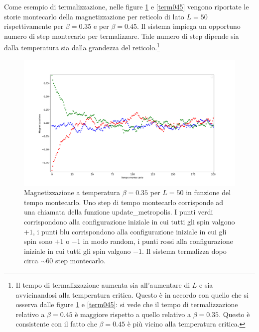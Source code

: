 \documentclass[10pt,a4paper]{article}
\begin{document}
Come esempio di termalizzazione, nelle figure \ref{term035} e \ref{term045} vengono riportate le storie montecarlo della magnetizzazione per reticolo di lato $L=50$ rispettivamente per $\beta=0.35$ e per $\beta=0.45$. Il sistema impiega un opportuno numero di step montecarlo per termalizzare. Tale numero di step dipende sia dalla temperatura sia dalla grandezza del reticolo.\footnote{Il tempo di termalizzazione aumenta sia all'aumentare di $L$ e sia avvicinandosi alla temperatura critica. Questo è in accordo con quello che si osserva dalle figure \ref{term035} e \ref{term045}: si vede che il tempo di termalizzazione relativo a $\beta=0.45$ è maggiore rispetto a quello relativo a $\beta=0.35$. Questo è consistente con il fatto che $\beta=0.45$ è più vicino alla temperatura critica.}
\begin{figure}[h!]%
	\centering
	\includegraphics[width=0.90\linewidth]{term035}
	\caption{Magnetizzazione a temperatura $\beta=0.35$ per $L=50$ in funzione del tempo montecarlo. Uno step di tempo montecarlo corrisponde ad una chiamata della funzione update\_metropolis. I punti verdi corrispondono alla configurazione iniziale in cui tutti gli spin valgono $+1$, i punti blu corrispondono alla configurazione iniziale in cui gli spin sono $+1$ o $-1$ in modo random, i punti rossi alla configurazione iniziale in cui tutti gli spin valgono $-1$. Il sistema termalizza dopo circa $\sim 60$ step montecarlo.}
	\label{term035}
\end{figure}
\end{document}
